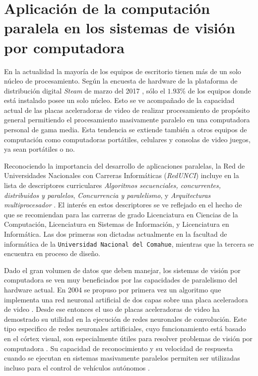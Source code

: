 \section{Aplicación de la computación paralela en los sistemas de visión por
computadora}

\label{algoritmosParalelosYVision}

En la actualidad la mayoría de los equipos de escritorio tienen más de un solo
núcleo de procesamiento. Según la encuesta de hardware de la plataforma de
distribución digital \emph{Steam} de marzo del 2017 \cite{steamSurvey}, sólo
el $1.93$\% de los equipos donde está instalado posee un solo núcleo. Esto se
ve acompañado de la capacidad actual de las placas aceleradoras de video de
realizar procesamiento de propósito general permitiendo el procesamiento
masivamente paralelo en una computadora personal de gama media. Esta tendencia
se extiende también a otros equipos de computación como computadoras
portátiles, celulares y consolas de video juegos, ya sean portátiles o no.

Reconociendo la importancia del desarrollo de aplicaciones paralelas, la Red
de Universidades Nacionales con Carreras Informáticas (\emph{RedUNCI}) incluye
en la lista de descriptores curriculares \emph{Algoritmos secuenciales,
concurrentes, distribuidos y paralelos}, \emph{Concurrencia y paralelismo}, y
\emph{Arquitecturas multiprocesador} \cite{RedUNCI2015}. El interés en estos
descriptores se ve reflejado en el hecho de que se recomiendan para las
carreras de grado Licenciatura en Ciencias de la Computación, Licenciatura en
Sistemas de Información, y Licenciatura en Informática. Las dos primeras son
dictadas actualmente en la facultad de informática de la \texttt{Universidad
Nacional del Comahue}, mientras que la tercera se encuentra en proceso de
diseño.

Dado el gran volumen de datos que deben manejar, los sistemas de visión por
computadora se ven muy beneficiados por las capacidades de paralelismo del
hardware actual. En 2004 se propuso por primera vez un algoritmo que implementa
una red neuronal artificial de dos capas sobre una placa aceleradora de video
\cite{GPUforMLA}. Desde ese entonces el uso de placas aceleradoras de video ha
demostrado su utilidad en la ejecución de redes neuronales de convolución. Este
tipo especifico de redes neuronales artificiales, cuyo funcionamiento está
basado en el córtex visual, son especialmente útiles para resolver problemas de
visión por computadora \cite{usingCCN4IR2015}. Su capacidad de reconocimiento y
su velocidad de respuesta cuando se ejecutan en sistemas masivamente paralelos
permiten ser utilizadas incluso para el control de vehículos autónomos
\cite{e2eLearning4SDC}.

